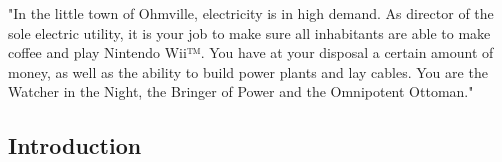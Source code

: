 "In the little town of Ohmville, electricity is in high demand. As director of the sole electric 
utility, it is your job to make sure all inhabitants are able to make coffee and play Nintendo Wii™. 
You have at your disposal a certain amount of money, as well as the ability to build power plants 
and lay cables. You are the Watcher in the Night, the Bringer of Power and the Omnipotent Ottoman."

\subsection{Introduction}